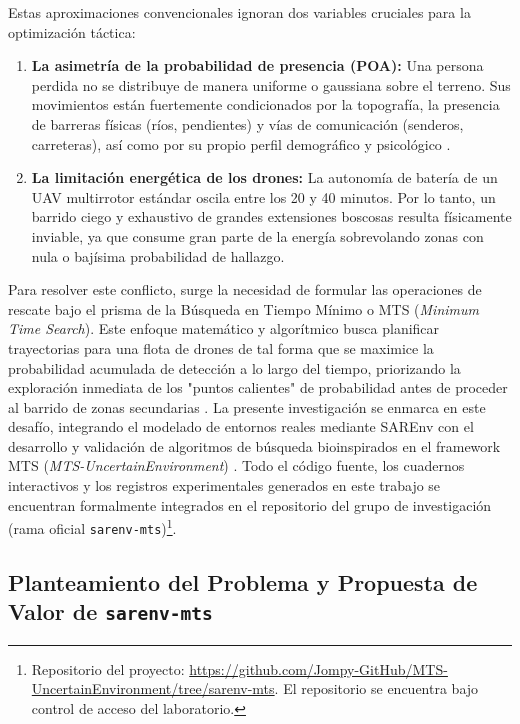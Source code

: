 Estas aproximaciones convencionales ignoran dos variables cruciales para la optimización táctica:
\begin{enumerate}
    \item \textbf{La asimetría de la probabilidad de presencia (POA):} Una persona perdida no se distribuye de manera uniforme o gaussiana sobre el terreno. Sus movimientos están fuertemente condicionados por la topografía, la presencia de barreras físicas (ríos, pendientes) y vías de comunicación (senderos, carreteras), así como por su propio perfil demográfico y psicológico \cite{koester2008lost}.
    \item \textbf{La limitación energética de los drones:} La autonomía de batería de un UAV multirrotor estándar oscila entre los 20 y 40 minutos. Por lo tanto, un barrido ciego y exhaustivo de grandes extensiones boscosas resulta físicamente inviable, ya que consume gran parte de la energía sobrevolando zonas con nula o bajísima probabilidad de hallazgo.
\end{enumerate}

Para resolver este conflicto, surge la necesidad de formular las operaciones de rescate bajo el prisma de la Búsqueda en Tiempo Mínimo o MTS (\textit{Minimum Time Search}). Este enfoque matemático y algorítmico busca planificar trayectorias para una flota de drones de tal forma que se maximice la probabilidad acumulada de detección a lo largo del tiempo, priorizando la exploración inmediata de los "puntos calientes" de probabilidad antes de proceder al barrido de zonas secundarias \cite{lanillos-bayesian}. La presente investigación se enmarca en este desafío, integrando el modelado de entornos reales mediante SAREnv \cite{drones9090628} con el desarrollo y validación de algoritmos de búsqueda bioinspirados en el framework MTS (\textit{MTS-UncertainEnvironment}) \cite{Broton_Gutierrez_MTS-UncertainEnvironment}. Todo el código fuente, los cuadernos interactivos y los registros experimentales generados en este trabajo se encuentran formalmente integrados en el repositorio del grupo de investigación (rama oficial \texttt{sarenv-mts})\footnote{Repositorio del proyecto: \url{https://github.com/Jompy-GitHub/MTS-UncertainEnvironment/tree/sarenv-mts}. El repositorio se encuentra bajo control de acceso del laboratorio.}.

\subsection{Planteamiento del Problema y Propuesta de Valor de \texttt{sarenv-mts}}

